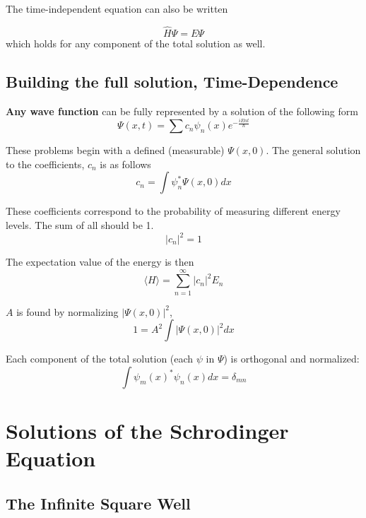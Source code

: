 The time-independent equation can also be written

\begin{equation}
  \hat{H}\Psi=E\Psi
\end{equation}
which holds for any component of the total solution as well.

\subsection{Building the full solution, Time-Dependence}
\textbf{Any wave function }can be fully represented by a solution of the following form
\begin{equation}
  \Psi(x,t)=\sum c_{n}\psi_{n}(x)e^{-\frac{iEnt}{\hbar}}
\end{equation}

These problems begin with a defined (measurable) $ \Psi(x,0) $. The general solution to the coefficients, $ c_{n} $ is as follows
\begin{equation}
  c_{n}=\int\psi_{n}^{*}\Psi(x,0)dx
\end{equation}

These coefficients correspond to the probability of measuring different energy levels. The sum of all should be 1. 
\begin{equation}
  |c_{n}|^2=1
\end{equation}

The expectation value of the energy is then
\begin{equation}
  \langle H\rangle = \sum_{n=1}^{\infty}|c_{n}|^2E_{n}
\end{equation}


$ A $ is found by normalizing $ |\Psi(x,0)|^2 $,
\begin{equation}
  1 = A^2\int|\Psi(x,0)|^2dx
\end{equation}


Each component of the total solution (each $ \psi  $ in $ \Psi $) is orthogonal and normalized:
\begin{equation}
  \int\psi_{m}(x)^{*}\psi_{n}(x)dx=\delta_{mn}
\end{equation}

\section{Solutions of the Schrodinger Equation}

\subsection{The Infinite Square Well}

